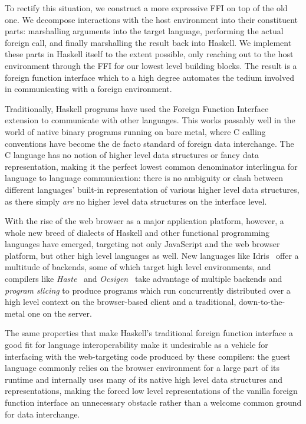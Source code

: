 \documentclass[preprint]{sigplanconf}
\begin{document}
To rectify this situation, we construct a more expressive FFI on top of the
old one. We decompose interactions with the host environment into their
constituent parts: marshalling arguments into the target language,
performing the actual foreign call,
and finally marshalling the result back into Haskell.
We implement these parts in Haskell itself to the extent possible,
only reaching out to the host environment through the FFI for our lowest level
building blocks. The result is a foreign function interface which to a high
degree automates the tedium involved in communicating with a foreign
environment.

Traditionally, Haskell programs have used the Foreign Function Interface
extension to communicate with other languages. This works
passably well in the world of native binary programs running on bare metal,
where C calling conventions have become the de facto standard of foreign
data interchange.
The C language has no notion of higher level data structures or
fancy data representation, making it the perfect lowest common denominator
interlingua for language to language communication:
there is no ambiguity or clash between different languages' built-in
representation of various higher level data structures, as there simply
\emph{are} no higher level data structures on the interface level.

With the rise of the web browser as a major application platform, however,
a whole new breed of dialects of Haskell and other functional
programming languages have emerged, targeting not only JavaScript and the
web browser platform, but other high level languages as well.
New languages like Idris\ \cite{idris} offer a multitude of backends,
some of which target high level environments, and compilers like \emph{Haste}\
\cite{haste} and
\emph{Ocsigen}\ \cite{ocsigen} take advantage of multiple backends and
\emph{program slicing} to produce programs which run concurrently
distributed over a high level context on the browser-based client and a
traditional, down-to-the-metal one on the server.

The same properties that make Haskell's traditional foreign function interface
a good fit for language interoperability make it undesirable as a vehicle for
interfacing with the web-targeting code produced by these compilers: the guest
language commonly relies on the browser environment for a large part of its
runtime and internally uses many of its native high level data structures and
representations, making the forced low level representations of the vanilla
foreign function interface an unnecessary obstacle rather than a welcome
common ground for data interchange.
\end{document}
